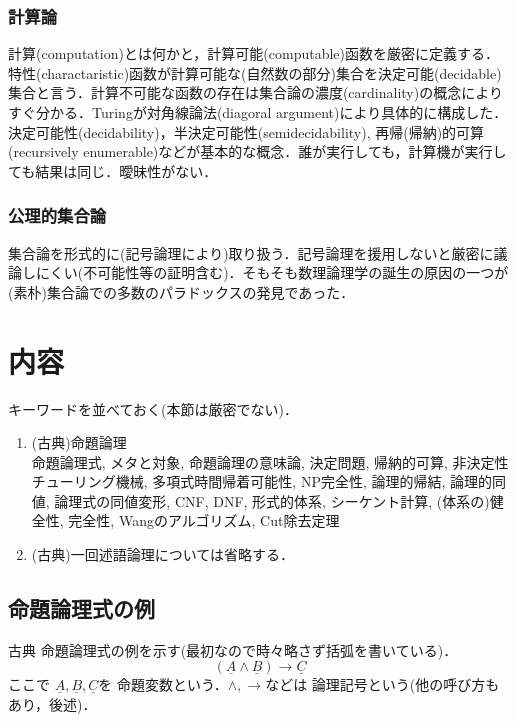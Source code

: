 \documentclass{ltjsarticle}
\theoremstyle{mystyle1}
\theoremstyle{mystyle2}
\newcommand{\uA}{\underline{A}}
\newcommand{\uB}{\underline{B}}
\newcommand{\uC}{\underline{C}}
\newcommand{\red}[1]{{\color{red} #1}}
\begin{document}
\subsubsection{計算論}
計算(computation)とは何かと，計算可能(computable)函数を厳密に定義する．特性(charactaristic)函数が計算可能な(自然数の部分)集合を決定可能(decidable)集合と言う．計算不可能な函数の存在は集合論の濃度(cardinality)の概念によりすぐ分かる．Turingが対角線論法(diagoral argument)により具体的に構成した．決定可能性(decidability)，半決定可能性(semidecidability), 再帰(帰納)的可算(recursively enumerable)などが基本的な概念．誰が実行しても，計算機が実行しても結果は同じ．曖昧性がない．
\subsubsection{公理的集合論}
集合論を形式的に(記号論理により)取り扱う．記号論理を援用しないと厳密に議論しにくい(不可能性等の証明含む)．そもそも数理論理学の誕生の原因の一つが(素朴)集合論での多数のパラドックスの発見であった．

\section{内容}
キーワードを並べておく(本節は厳密でない)．
\begin{enumerate}
  \item (古典)命題論理\\命題論理式, メタと対象, 命題論理の意味論, 決定問題, 帰納的可算, 非決定性チューリング機械, 多項式時間帰着可能性, NP完全性, 論理的帰結, 論理的同値, 論理式の同値変形, CNF, DNF, 形式的体系, シーケント計算, (体系の)健全性, 完全性, Wangのアルゴリズム, Cut除去定理
  \item (古典)一回述語論理については省略する．
\end{enumerate}

\subsection{命題論理式の例}
古典\red{命題論理式}の例を示す(最初なので時々略さず括弧を書いている)．
\[\left(\uA\wedge\uB\right)\to\uC\]
ここで $\uA,\uB,\uC$を\red{命題変数}という．$\wedge,\to$などは\red{論理記号}という(他の呼び方もあり，後述)．
\end{document}
